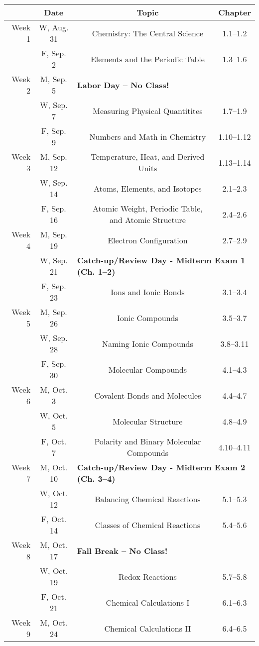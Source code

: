 \begin{tabular}{rcccc}
& Date && Topic & Chapter\\
\midrule
Week 1 & W, Aug. 31&& Chemistry: The Central Science & 1.1--1.2\\
& F, Sep. 2&& Elements and the Periodic Table & 1.3--1.6\\
\midrule
Week 2 & M, Sep. 5& \multicolumn{3}{l}{\textbf{Labor Day -- No Class!}}\\
& W, Sep. 7&& Measuring Physical Quantitites & 1.7--1.9\\
& F, Sep. 9&& Numbers and Math in Chemistry & 1.10--1.12\\
\midrule
Week 3 & M, Sep. 12&& Temperature, Heat, and Derived Units & 1.13--1.14\\
& W, Sep. 14&& Atoms, Elements, and Isotopes & 2.1--2.3\\
& F, Sep. 16&& Atomic Weight, Periodic Table, and Atomic Structure & 2.4--2.6\\
\midrule
Week 4 & M, Sep. 19&& Electron Configuration & 2.7--2.9\\
& W, Sep. 21& \multicolumn{3}{l}{\textbf{Catch-up/Review Day - Midterm Exam 1 (Ch. 1--2)}}\\
& F, Sep. 23&& Ions and Ionic Bonds & 3.1--3.4\\
\midrule
Week 5 & M, Sep. 26&& Ionic Compounds & 3.5--3.7\\
& W, Sep. 28&& Naming Ionic Compounds & 3.8--3.11\\
& F, Sep. 30&& Molecular Compounds & 4.1--4.3\\
\midrule
Week 6 & M, Oct. 3&& Covalent Bonds and Molecules & 4.4--4.7\\
& W, Oct. 5&& Molecular Structure & 4.8--4.9\\
& F, Oct. 7&& Polarity and Binary Molecular Compounds & 4.10--4.11\\
\midrule
Week 7 & M, Oct. 10& \multicolumn{3}{l}{\textbf{Catch-up/Review Day - Midterm Exam 2 (Ch. 3--4)}}\\
& W, Oct. 12&& Balancing Chemical Reactions & 5.1--5.3\\
& F, Oct. 14&& Classes of Chemical Reactions & 5.4--5.6\\
\midrule
Week 8 & M, Oct. 17& \multicolumn{3}{l}{\textbf{Fall Break -- No Class!}}\\
& W, Oct. 19&& Redox Reactions & 5.7--5.8\\
& F, Oct. 21&& Chemical Calculations I & 6.1--6.3\\
\midrule
Week 9 & M, Oct. 24&& Chemical Calculations II & 6.4--6.5\\

\end{tabular}

